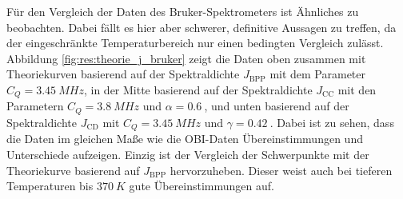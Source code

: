 Für den Vergleich der Daten des Bruker-Spektrometers ist Ähnliches zu beobachten. Dabei fällt es hier aber schwerer, definitive Aussagen zu treffen, da der eingeschränkte Temperaturbereich nur einen bedingten Vergleich zulässt. Abbildung \ref{fig:res:theorie_j_bruker} zeigt die Daten oben zusammen mit Theoriekurven basierend auf der Spektraldichte $J_\text{BPP}$ mit dem Parameter $C_Q = \SI{3.45}{MHz}$, in der Mitte basierend auf der Spektraldichte $J_\text{CC}$ mit den Parametern $C_Q = \SI{3.8}{MHz}$ und $\alpha = \SI{0.6}{}$, und unten basierend auf der Spektraldichte $J_\text{CD}$ mit $C_Q = \SI{3.45}{MHz}$ und $\gamma = \SI{0.42}{}$. Dabei ist zu sehen, dass die Daten im gleichen Maße wie die OBI-Daten Übereinstimmungen und Unterschiede aufzeigen. Einzig ist der Vergleich der Schwerpunkte mit der Theoriekurve basierend auf $J_\text{BPP}$ hervorzuheben. Dieser weist auch bei tieferen Temperaturen bis $\SI{370}{K}$ gute Übereinstimmungen auf.
